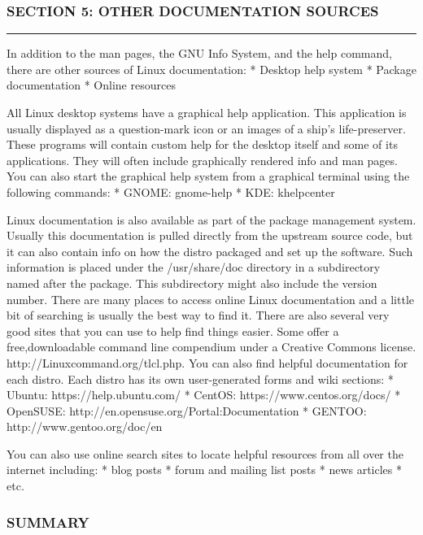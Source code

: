 \subsubsection{SECTION 5: OTHER DOCUMENTATION
SOURCES}\label{section-5-other-documentation-sources}

\begin{center}\rule{3in}{0.4pt}\end{center}

In addition to the man pages, the GNU Info System, and the help command,
there are other sources of Linux documentation: * Desktop help system *
Package documentation * Online resources

All Linux desktop systems have a graphical help application. This
application is usually displayed as a question-mark icon or an images of
a ship's life-preserver. These programs will contain custom help for the
desktop itself and some of its applications. They will often include
graphically rendered info and man pages. You can also start the
graphical help system from a graphical terminal using the following
commands: * GNOME: gnome-help * KDE: khelpcenter

Linux documentation is also available as part of the package management
system. Usually this documentation is pulled directly from the upstream
source code, but it can also contain info on how the distro packaged and
set up the software. Such information is placed under the /usr/share/doc
directory in a subdirectory named after the package. This subdirectory
might also include the version number. There are many places to access
online Linux documentation and a little bit of searching is usually the
best way to find it. There are also several very good sites that you can
use to help find things easier. Some offer a free,downloadable command
line compendium under a Creative Commons license.
http://Linuxcommand.org/tlcl.php. You can also find helpful
documentation for each distro. Each distro has its own user-generated
forms and wiki sections: * Ubuntu: https://help.ubuntu.com/ * CentOS:
https://www.centos.org/docs/ * OpenSUSE:
http://en.opensuse.org/Portal:Documentation * GENTOO:
http://www.gentoo.org/doc/en

You can also use online search sites to locate helpful resources from
all over the internet including: * blog posts * forum and mailing list
posts * news articles * etc.

\subsubsection{SUMMARY}\label{summary-4}

